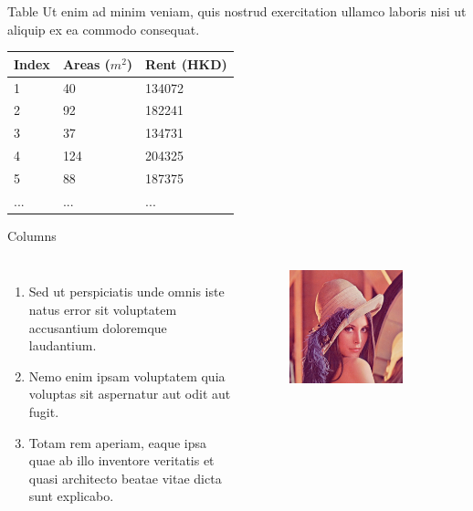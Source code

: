 \documentclass{beamer}
\begin{document}
	\begin{frame}{Table}
		Ut enim ad minim veniam, quis nostrud exercitation ullamco laboris nisi ut aliquip ex ea commodo consequat.
		\vspace{0.4in}
		\begin{table}
			\footnotesize
			\begin{tabular}{l | l | l}
				Index & Areas ($m^2$) & Rent (HKD) \\
				\hline \hline
				1 & 40 & 134072 \\ 
				2 & 92 & 182241 \\
				3 & 37 & 134731 \\
				4 & 124 & 204325 \\
				5 & 88 & 187375 \\
				... & ... & ...
			\end{tabular}
		\end{table}
	\end{frame}
	
	
	\begin{frame}{Columns}
		\begin{columns}
			\begin{enumerate}
				\item Sed ut perspiciatis unde omnis iste natus error sit voluptatem accusantium doloremque laudantium.
				\item Nemo enim ipsam voluptatem quia voluptas sit aspernatur aut odit aut fugit.
				\item Totam rem aperiam, eaque ipsa quae ab illo inventore veritatis et quasi architecto beatae vitae dicta sunt explicabo.
			\end{enumerate}
			\begin{figure}
				\includegraphics[width=0.8\textwidth]{images/lenna.jpg}
			\end{figure}
		\end{columns}
	\end{frame}
	
\end{document}
